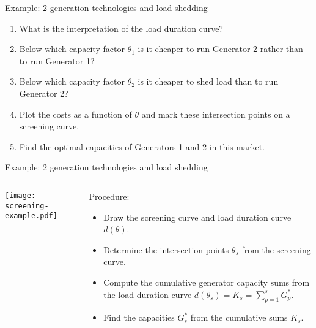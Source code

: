 \documentclass[10pt,aspectratio=169,dvipsnames]{beamer}
\let\olditem\item
\renewcommand{\item}{%
\olditem\vspace{5pt}}
\begin{document}
\begin{frame}{Example: 2 generation technologies and load shedding}
\begin{enumerate}
  \item What is the interpretation of the  load duration curve?
  \item Below which capacity factor $\theta_1$ is it cheaper to run Generator 2 rather than to run Generator 1?
  \item Below which capacity factor $\theta_2$ is it cheaper to shed load than to run Generator 2?
  \item Plot the costs as a function of
    $\theta$ and mark these intersection points on a screening curve.
  \item Find the optimal capacities of Generators 1 and 2 in this market.
\end{enumerate}
\end{frame}



\begin{frame}{Example: 2 generation technologies and load shedding}
  \begin{columns}[T]
  \begin{column}{6cm}

    \texttt{[image: screening-example.pdf]}

  \end{column}
  \begin{column}{7cm}
    Procedure:
    \begin{itemize}
    \item Draw the screening curve and load duration curve $d(\theta)$.
    \item Determine the intersection points $\theta_s$ from the screening curve.
    \item Compute the cumulative generator capacity sums from the load duration curve $d(\theta_s) = K_s = \sum_{p=1}^s G_p^*$.
      \item Find the capacities $G_s^*$ from the cumulative sums $K_s$.
    \end{itemize}
  \end{column}
  \end{columns}

\end{frame}
\end{document}
